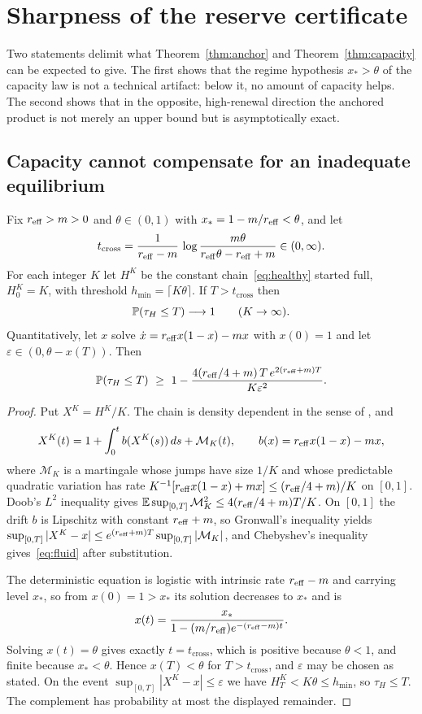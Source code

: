 \section{Sharpness of the reserve certificate}\label{sec:sharp}
Two statements delimit what Theorem~\ref{thm:anchor} and Theorem~\ref{thm:capacity} can be expected to give. The first shows that the regime hypothesis $x_*>\theta$ of the capacity law is not a technical artifact: below it, no amount of capacity helps. The second shows that in the opposite, high-renewal direction the anchored product is not merely an upper bound but is asymptotically exact.

\subsection{Capacity cannot compensate for an inadequate equilibrium}\label{sec:regime}
\begin{proposition}\label{prop:regime}
Fix $r_{\mathrm{eff}}>m>0$ and $\theta\in(0,1)$ with $x_*=1-m/r_{\mathrm{eff}}<\theta$, and let
\[
 t_{\mathrm{cross}}
 =\frac1{r_{\mathrm{eff}}-m}\,\log\frac{m\theta}{r_{\mathrm{eff}}\theta-r_{\mathrm{eff}}+m}\in(0,\infty).
\]
For each integer $K$ let $H^K$ be the constant chain~\eqref{eq:healthy} started full, $H^K_0=K$, with threshold $h_{\min}=\lceil K\theta\rceil$. If $T>t_{\mathrm{cross}}$ then
\[
 \mathbb P(\tau_H\le T)\longrightarrow1\qquad(K\to\infty).
\]
Quantitatively, let $x$ solve $\dot x=r_{\mathrm{eff}} x(1-x)-mx$ with $x(0)=1$ and let $\varepsilon\in(0,\theta-x(T))$. Then
\begin{equation}\label{eq:fluid}
 \mathbb P(\tau_H\le T)\ \ge\
 1-\frac{4(r_{\mathrm{eff}}/4+m)\,T\,e^{2(r_{\mathrm{eff}}+m)T}}{K\varepsilon^2}.
\end{equation}
\end{proposition}

\begin{proof}
Put $X^K=H^K/K$. The chain is density dependent in the sense of \citet{kurtz1970}, and
\[
 X^K(t)=1+\int_0^t b(X^K(s))\,ds+\mathcal M_K(t),
 \qquad b(x)=r_{\mathrm{eff}} x(1-x)-mx,
\]
where $\mathcal M_K$ is a martingale whose jumps have size $1/K$ and whose predictable quadratic variation has rate $K^{-1}[r_{\mathrm{eff}} x(1-x)+mx]\le(r_{\mathrm{eff}}/4+m)/K$ on $[0,1]$. Doob's $L^2$ inequality gives
$\mathbb E\sup_{[0,T]}\mathcal M_K^2\le4(r_{\mathrm{eff}}/4+m)T/K$. On $[0,1]$ the drift $b$ is Lipschitz with constant $r_{\mathrm{eff}}+m$, so Gronwall's inequality yields
$\sup_{[0,T]}|X^K-x|\le e^{(r_{\mathrm{eff}}+m)T}\sup_{[0,T]}|\mathcal M_K|$, and Chebyshev's inequality gives~\eqref{eq:fluid} after substitution.

The deterministic equation is logistic with intrinsic rate $r_{\mathrm{eff}}-m$ and carrying level $x_*$, so from $x(0)=1>x_*$ its solution decreases to $x_*$ and is
\[
 x(t)=\frac{x_*}{1-(m/r_{\mathrm{eff}})e^{-(r_{\mathrm{eff}}-m)t}}.
\]
Solving $x(t)=\theta$ gives exactly $t=t_{\mathrm{cross}}$, which is positive because $\theta<1$, and finite because $x_*<\theta$. Hence $x(T)<\theta$ for $T>t_{\mathrm{cross}}$, and $\varepsilon$ may be chosen as stated. On the event $\sup_{[0,T]}|X^K-x|\le\varepsilon$ we have $H^K_T<K\theta\le h_{\min}$, so $\tau_H\le T$. The complement has probability at most the displayed remainder.
\end{proof}

